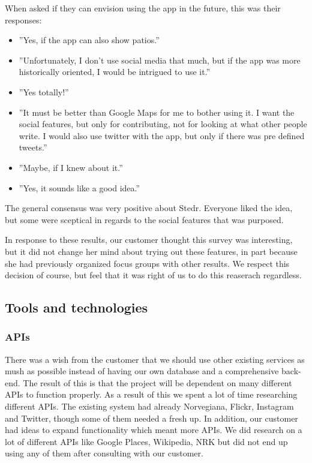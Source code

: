 	When asked if they can envision using the app in the future, this was their responses:
\begin{itemize}
	\item ”Yes, if the app can also show patios.”
	\item ”Unfortunately, I don't use social media that much, but if the app was more historically oriented, I would be intrigued to use it.”
	\item ”Yes totally!”
	\item ”It must be better than Google Maps for me to bother using it. I want the social features, but only for contributing, not for looking at what other people write. I would also use twitter with the app, but only if there was pre defined tweets.”
	\item”Maybe, if I knew about it.”
	\item ”Yes, it sounds like a good idea.”
\end{itemize}

	The general consensus was very positive about Stedr. Everyone liked the idea, but some were sceptical in regards to the social features that was purposed.

	In response to these results, our customer thought this survey was interesting, but it did not change her mind about trying out these features, in part because she had previously organized focus groups with other results. We respect this decision of course, but feel that it was right of us to do this reaserach regardless.
	
	\subsection{Tools and technologies}
	
		\subsubsection{APIs}
		

		There was a wish from the customer that we should use other existing services as mush as possible instead of having our own database and a comprehensive back-end. The result of this is that the project will be dependent on many different APIs to function properly. As a result of this we spent a lot of time researching different APIs. The existing system had already Norvegiana, Flickr, Instagram and Twitter, though some of them needed a fresh up. In addition, our customer had ideas to expand functionality which meant more APIs. We did research on a lot of different APIs like Google Places, Wikipedia, NRK but did not end up using any of them after consulting with our customer. 
		

